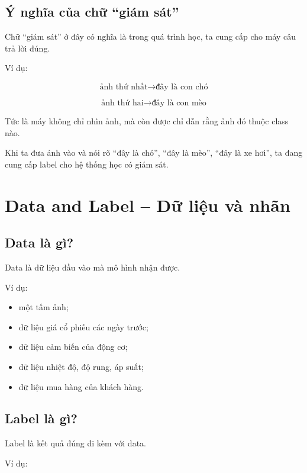 \subsection{Ý nghĩa của chữ ``giám sát''}

Chữ ``giám sát'' ở đây có nghĩa là trong quá trình học, ta cung cấp cho máy câu trả lời đúng.

Ví dụ:

\[
    \text{ảnh thứ nhất}
    \rightarrow
    \text{đây là con chó}
\]

\[
    \text{ảnh thứ hai}
    \rightarrow
    \text{đây là con mèo}
\]

Tức là máy không chỉ nhìn ảnh, mà còn được chỉ dẫn rằng ảnh đó thuộc class nào.

\begin{vidu}
Khi ta đưa ảnh vào và nói rõ ``đây là chó'', ``đây là mèo'', ``đây là xe hơi'', ta đang cung cấp label cho hệ thống học có giám sát.
\end{vidu}

\section{Data and Label -- Dữ liệu và nhãn}

\subsection{Data là gì?}

Data là dữ liệu đầu vào mà mô hình nhận được.

Ví dụ:

\begin{itemize}
    \item một tấm ảnh;
    \item dữ liệu giá cổ phiếu các ngày trước;
    \item dữ liệu cảm biến của động cơ;
    \item dữ liệu nhiệt độ, độ rung, áp suất;
    \item dữ liệu mua hàng của khách hàng.
\end{itemize}

\subsection{Label là gì?}

Label là kết quả đúng đi kèm với data.

Ví dụ:

